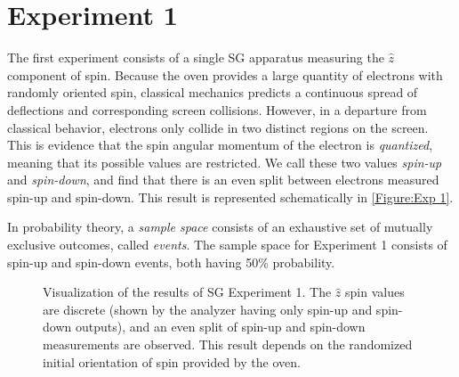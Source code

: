 \section{Experiment 1} \label{og experiment 1}
The first experiment consists of a single SG apparatus measuring the $\hat{z}$ component of spin. Because the oven provides a large quantity of electrons with randomly oriented spin, classical mechanics predicts a continuous spread of deflections and corresponding screen collisions. However, in a departure from classical behavior, electrons only collide in two distinct regions on the screen. This is evidence that the spin angular momentum of the electron is \textit{quantized}, meaning that its possible values are restricted. We call these two values \textit{spin-up} and \textit{spin-down}, and find that there is an even split between electrons measured spin-up and spin-down. This result is represented schematically in \autoref{Figure:Exp 1}.

In probability theory, a \textit{sample space} consists of an exhaustive set of mutually exclusive outcomes, called \textit{events}. The sample space for Experiment 1 consists of spin-up and spin-down events, both having 50\% probability.

\begin{figure}[!htb]
\centering\CaptionFontSize
{}

\caption[Results of Stern-Gerlach Experiment 1]
{Visualization of the results of SG Experiment 1. The $\hat{z}$ spin values are discrete (shown by the analyzer having only spin-up and spin-down outputs), and an even split of spin-up and spin-down measurements are observed. This result depends on the randomized initial orientation of spin provided by the oven.}
\label{Figure:Exp 1}
\end{figure}

